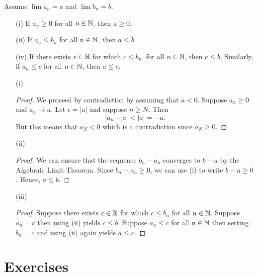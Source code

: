 \begin{tcolorbox}
    \begin{thm} 
    Assume \( \lim a_n  = a\) and \( \lim b_n =  b\).
    \begin{enumerate}
        \item[(i)] If \( a_n \geq 0 \) for all \( n \in \mathbb{N} \), then \( a \geq 0\).
        \item[(ii)] If \( a_n \leq b_n\) for all \( n \in \mathbb{N} \), then \( a \leq b \).
        \item[(iv)] If there exists \( c \in \mathbb{R} \) for which \( c \leq b_n\), for all \( n \in \mathbb{N} \), then 
        \( c \leq b \). Similarly, if \( a_n \leq c \) for all \( n \in \mathbb{N} \), then \( a \leq c\).
    \end{enumerate}
    \end{thm}
\end{tcolorbox}

\begin{enumerate}


    \item[(i)] \begin{proof}
We proceed by contradiction by assuming that \( a < 0 \). Suppose \( a_n \geq 0 \) and \( a_n \to a \). Let \( \epsilon  = | a |\) and suppose \( n \geq N \). Then
\[ | a_n - a | < | a | = -a.\]
But this means that \( a_N < 0\) which is a contradiction since \( a_N \geq 0\).
\end{proof}
    \item[(ii)]
        \begin{proof}
        We can ensure that the sequence \( b_n - a_n\) converges to \( b - a\) by the Algebraic Limit Theorem. Since \( b_n - a_n \geq 0\), we can use (i) to write \( b - a \geq 0\). Hence, \( a \leq b\).
        \end{proof}
    \item[(iii)]
        \begin{proof}
            Suppose there exists \( c \in \mathbb{R}  \) for which \( c \leq b_n\) for all \( n \in \mathbb{N} \). Suppose \( a_n  = c \) then using (ii) yields \( c \leq b\). Suppose \( a_n \leq c\) for all \( n \in \mathbb{N} \) then setting \( b_n = c \) and using (ii) again yields \( a \leq c\).
        \end{proof}
\end{enumerate}


\section{Exercises}



